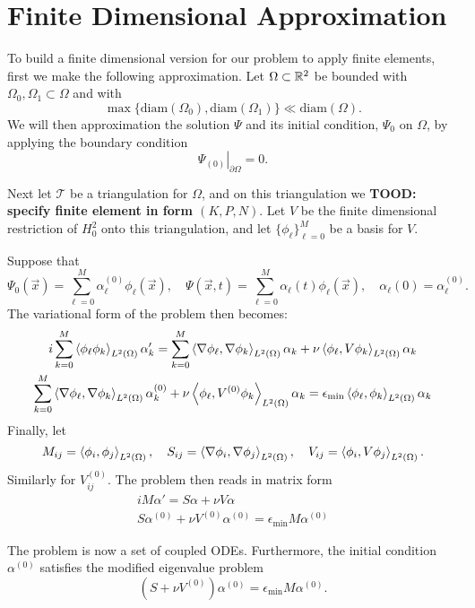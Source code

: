 \documentclass[../../main.tex]{subfiles}
\begin{document}
\section{Finite Dimensional Approximation}

To build a finite dimensional version for our problem
to apply finite elements, 
first we make the following approximation.
Let $\Omega \subset \mathbb{R}^2$ be bounded with 
$\Omega_0, \Omega_1 \subset \Omega$ and with
\[
		\max\{\mathrm{diam}(\Omega_0), 
		\mathrm{diam}(\Omega_1)\} \ll 
		\mathrm{diam}(\Omega)
.\] 
We will then approximation the solution $\Psi$ and its 
initial condition, $\Psi_0$ on $\Omega$, 
by applying the boundary condition
\[
		\left.\Psi_{(0)}\right|_{\partial \Omega} = 0
.\] 

Next let $\mathcal T$ be a triangulation for $\Omega$,
and on this triangulation we 
\textbf{TOOD: specify finite element in form $(K, P, N)$}.
Let $V$ be the finite dimensional restriction of $H_0^2$ onto 
this triangulation, and let 
$\{\phi_\ell\}_{\ell=0}^M$ be a basis for $V$.

Suppose that 
\[
		\Psi_0(\vec x) = \sum_{\ell=0}^M \alpha^{(0)}_\ell \phi_\ell(\vec x),
		\quad \Psi(\vec x, t) = 
		\sum_{\ell=0}^M \alpha_\ell(t) \phi_\ell(\vec x), \quad 
		\alpha_\ell(0) = \alpha^{(0)}_\ell
.\] 
The variational form of the problem then becomes:
\begin{gather}
		i \sum_{k=0}^M \left\langle \phi_\ell \phi_k \right\rangle_{L^2(\Omega)} \alpha_k' = 
		\sum_{k=0}^M \left\langle \nabla \phi_\ell, \nabla \phi_k \right\rangle_{L^2(\Omega)}
		\alpha_k + \nu \left\langle \phi_\ell, V \phi_k \right\rangle_{L^2(\Omega)} \alpha_k \\
		\sum_{k=0}^M \left\langle \nabla \phi_\ell, \nabla \phi_k \right\rangle_{L^2(\Omega)} 
		\alpha_k^{(0)} + 
		\nu \left\langle \phi_\ell, V^{(0)} \phi_k \right\rangle_{L^2(\Omega)} \alpha_k = 
		\epsilon_\mathrm{min} \left\langle \phi_\ell, \phi_k \right\rangle_{L^2(\Omega)} \alpha_k	
\end{gather}
Finally, let 
\[
		M_{ij} = \left\langle \phi_i, \phi_j \right\rangle_{L^2(\Omega)}, \quad 
		S_{ij} = \left\langle \nabla \phi_i, \nabla \phi_j \right\rangle_{L^2(\Omega)}, \quad
		V_{ij} = \left\langle \phi_i, V \phi_j \right\rangle_{L^2(\Omega)}
.\] 
Similarly for $V^{(0)}_{ij}$.
The problem then reads in matrix form
\begin{gather}
  i M \alpha' = S \alpha + \nu V \alpha \\
  S \alpha^{(0)} + \nu V^{(0)} \alpha^{(0)} = 
  \epsilon_\mathrm{min} M \alpha^{(0)}
\end{gather}

The problem is now a set of coupled ODEs.  
Furthermore, the initial condition $\alpha^{(0)}$ satisfies 
the modified eigenvalue problem
\[
		(S + \nu V^{(0)}) \alpha^{(0)} = 
		\epsilon_\mathrm{min} M \alpha^{(0)}
.\] 
\end{document}

